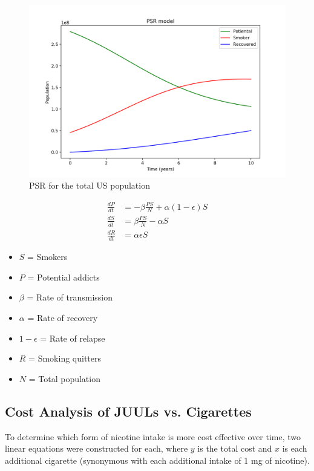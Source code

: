 \documentclass[12pt,letterpaper]{article}
\begin{document}
\begin{figure}[H]
  \centering
  \includegraphics[width=.8\linewidth]{PSR}
  \caption{PSR for the total US population}
  \label{fig:PSR}
\end{figure}

\begin{singlespace}
\begin{small}
\begin{equation}
\label{eq:1}
\begin{aligned}
\frac{dP}{dt} &= -\beta \frac{PS}{N} + \alpha ( 1 - \epsilon )S \\
\frac{dS}{dt} &= \beta \frac{PS}{N} - \alpha S \\
\frac{dR}{dt} &= \alpha \epsilon S
\end{aligned}
\end{equation}
\begin{itemize}[label=]
  \item $S$ = Smokers
  \item $P$ = Potential addicts
  \item $\beta$ = Rate of transmission
  \item $\alpha$ = Rate of recovery
  \item $1 - \epsilon$ = Rate of relapse
  \item $R$ = Smoking quitters
  \item $N$ = Total population
\end{itemize}
\end{small}
\end{singlespace}

\subsection{Cost Analysis of JUULs vs. Cigarettes}
\label{sec:cost}
To determine which form of nicotine intake is more cost effective over time, two linear equations were constructed for each, where $y$ is the total cost and $x$ is each additional cigarette (synonymous with each additional intake of 1 mg of nicotine).
\end{document}
